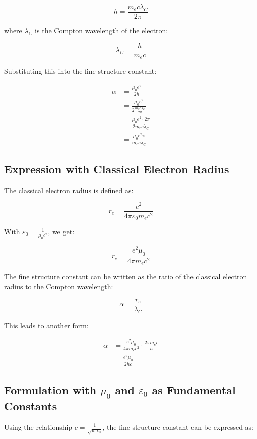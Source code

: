 \documentclass{article}
\begin{document}
	\begin{equation}
		h = \frac{m_e c \lambda_C}{2\pi}
	\end{equation}
	
	where $\lambda_C$ is the Compton wavelength of the electron:
	
	\begin{equation}
		\lambda_C = \frac{h}{m_e c}
	\end{equation}
	
	Substituting this into the fine structure constant:
	
	\begin{align}
		\alpha &= \frac{\mu_0e^2}{2h}\\
		&= \frac{\mu_0e^2}{2\frac{m_e c \lambda_C}{2\pi}}\\
		&= \frac{\mu_0e^2 \cdot 2\pi}{2m_e c \lambda_C}\\
		&= \frac{\mu_0e^2\pi}{m_e c \lambda_C}
	\end{align}
	
	\subsection{Expression with Classical Electron Radius}
	The classical electron radius is defined as:
	
	\begin{equation}
		r_e = \frac{e^2}{4\pi\varepsilon_0 m_e c^2}
	\end{equation}
	
	With $\varepsilon_0 = \frac{1}{\mu_0c^2}$, we get:
	
	\begin{equation}
		r_e = \frac{e^2\mu_0}{4\pi m_e c^2}
	\end{equation}
	
	The fine structure constant can be written as the ratio of the classical electron radius to the Compton wavelength:
	
	\begin{equation}
		\alpha = \frac{r_e}{\lambda_C}
	\end{equation}
	
	This leads to another form:
	
	\begin{align}
		\alpha &= \frac{e^2\mu_0}{4\pi m_e c^2} \cdot \frac{2\pi m_e c}{h}\\
		&= \frac{e^2\mu_0}{2hc}
	\end{align}
	
	\subsection{Formulation with $\mu_0$ and $\varepsilon_0$ as Fundamental Constants}
	Using the relationship $c = \frac{1}{\sqrt{\mu_0\varepsilon_0}}$, the fine structure constant can be expressed as:
	
\end{document}
